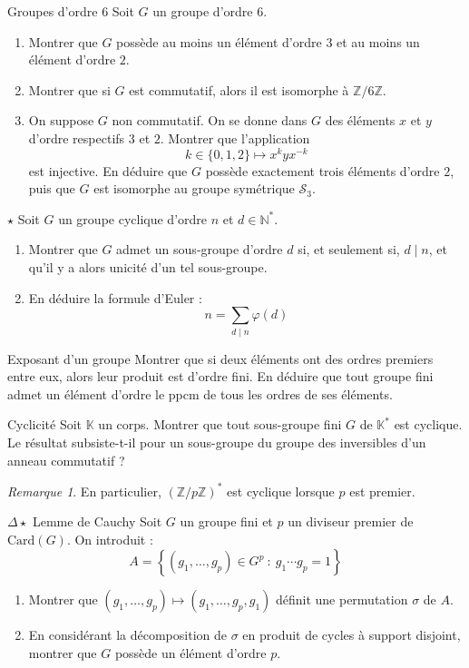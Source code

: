 \documentclass[french,a4paper]{article}
\newcommand{\N}{\mathbb{N}}
\newcommand{\Z}{\mathbb{Z}}
\newcommand{\K}{\mathbb{K}}
\newcommand{\st}{^*}
\newcommand{\card}{\text{Card}}
\theoremstyle{plain}
\theoremstyle{definition}
\theoremstyle{remark}
\newtheorem*{rmq}{Remarque}
\begin{document}
\begin{ex}[Moulin.21]{Groupes d'ordre 6}
	Soit $G$ un groupe d'ordre $6$.
	\begin{enumerate}
		\item Montrer que $G$ possède au moins un élément d'ordre $3$ et au moins un élément d'ordre $2$.
		\item Montrer que si $G$ est commutatif, alors il est isomorphe à $\Z/6\Z$.
		\item On suppose $G$ non commutatif. On se donne dans $G$ des éléments $x$ et $y$ d'ordre respectifs $3$ et $2$. Montrer que l'application $$k\in\{0,1,2\}\mapsto x^kyx^{-k}$$ est injective. En déduire que $G$ possède exactement trois éléments d'ordre $2$, puis que $G$ est isomorphe au groupe symétrique $\mathcal{S}_3$.
	\end{enumerate}
\end{ex}

\begin{ex}[Moulin.22]{$\star$}
	Soit $G$ un groupe cyclique d'ordre $n$ et $d\in\N\st$.
	\begin{enumerate}
		\item Montrer que $G$ admet un sous-groupe d'ordre $d$ si, et seulement si, $d\mid n$, et qu'il y a alors unicité d'un tel sous-groupe.
		\item En déduire la formule d'Euler : $$n=\sum_{d\mid n}\varphi(d)$$
	\end{enumerate}
\end{ex}

\begin{ex}{Exposant d'un groupe}
	Montrer que si deux éléments ont des ordres premiers entre eux, alors leur produit est d'ordre fini. En déduire que tout groupe fini admet un élément d'ordre le ppcm de tous les ordres de ses éléments.
\end{ex}

\begin{ex}[Moulin.44]{Cyclicité}
	Soit $\K$ un corps. Montrer que tout sous-groupe fini $G$ de $\K\st$ est cyclique. Le résultat subsiste-t-il pour un sous-groupe du groupe des inversibles d'un anneau commutatif ?
\end{ex}

\begin{rmq}
	En particulier, $(\Z/p\Z)\st$ est cyclique lorsque $p$ est premier.
\end{rmq}

\begin{ex}[Moulin.23]{$\Delta\star$ Lemme de Cauchy}
	Soit $G$ un groupe fini et $p$ un diviseur premier de $\card(G)$. On introduit : $$A=\left\{(g_1,\ldots,g_p)\in G^p\ : \ g_1\cdots g_p=1\right\}$$
	\begin{enumerate}
		\item Montrer que $(g_1,\ldots,g_p)\mapsto(g_1,\ldots,g_p,g_1)$ définit une permutation $\sigma$ de $A$.
		\item En considérant la décomposition de $\sigma$ en produit de cycles à support disjoint, montrer que $G$ possède un élément d'ordre $p$.
	\end{enumerate}
\end{ex}
\end{document}
